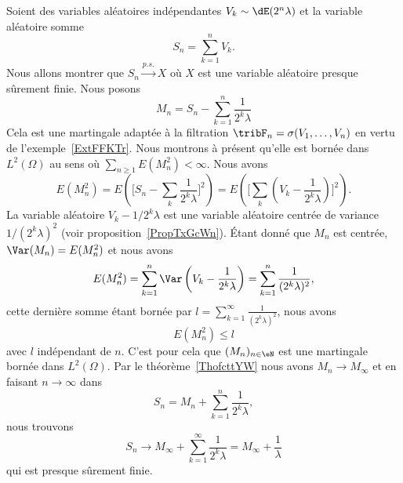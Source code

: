 \begin{example}
    Soient des variables aléatoires indépendantes \( V_k\sim\dE(2^n\lambda)\) et la variable aléatoire somme
    \begin{equation}
        S_n=\sum_{k=1}^nV_k.
    \end{equation}
    Nous allons montrer que \( S_n\stackrel{p.s.}{\longrightarrow}X\) où \( X\) est une variable aléatoire presque sûrement finie. Nous posons
    \begin{equation}
        M_n=S_n-\sum_{k=1}^n\frac{1}{ 2^k\lambda }
    \end{equation}
    Cela est une martingale adaptée à la filtration \( \tribF_n=\sigma(V_1,\ldots, V_n)\) en vertu de l'exemple~\ref{ExtFFKTr}. Nous montrons à présent qu'elle est bornée dans \( L^2(\Omega)\) au sens où \( \sum_{n\geq 1}E(M_n^2)<\infty\). Nous avons
    \begin{equation}
        E(M_n^2)=E\left( \big[ S_n-\sum_k\frac{1}{ 2^k\lambda } \big]^2 \right)=E\left( \big[ \sum_k(V_k-\frac{1}{ 2^k\lambda }) \big]^2 \right).
    \end{equation}
    La variable aléatoire \( V_k-1/2^k\lambda\) est une variable aléatoire centrée de variance \( 1/(2^k\lambda)^2\) (voir proposition~\ref{PropTxGcWn}). Étant donné que \( M_n\) est centrée, \( \Var(M_n)=E(M_n^2)\) et nous avons
    \begin{equation}
        E(M_n^2)=\sum_{k=1}^n\Var\left( V_k-\frac{1}{ 2^k\lambda } \right)=\sum_{k=1}^n\frac{1}{ (2^k\lambda)^2 },
    \end{equation}
    cette dernière somme étant bornée par \( l=\sum_{k=1}^{\infty}\frac{1}{ (2^k\lambda)^2 }\), nous avons
    \begin{equation}
        E(M_n^2)\leq l
    \end{equation}
    avec \( l\) indépendant de \( n\). C'est pour cela que \( (M_n)_{n\in \eN}\) est une martingale bornée dans \( L^2(\Omega)\). Par le théorème~\ref{ThofcttYW} nous avons \( M_n\to M_{\infty}\) et en faisant \( n\to \infty\) dans
    \begin{equation}
        S_n=M_n+\sum_{k=1}^n\frac{1}{ 2^k\lambda },
    \end{equation}
    nous trouvons
    \begin{equation}
        S_n\to M_{\infty}+\sum_{k=1}^{\infty}\frac{1}{ 2^k\lambda }=M_{\infty}+\frac{1}{ \lambda }
    \end{equation}
    qui est presque sûrement finie.
\end{example}

